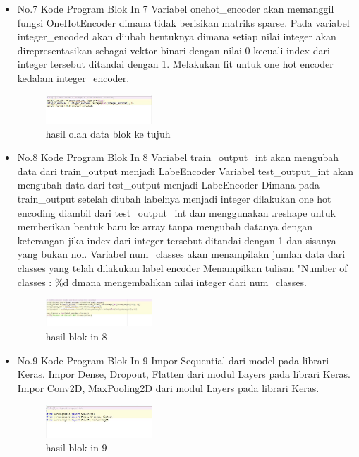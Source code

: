 \begin{enumerate}
\begin{itemize}
        \item  {No.7 Kode Program Blok In 7}
        \subitem Variabel onehot\_encoder akan memanggil fungsi OneHotEncoder dimana tidak berisikan matriks sparse.
        \subitem  Pada variabel integer\_encoded akan diubah bentuknya dimana setiap nilai integer akan direpresentasikan sebagai vektor binari dengan nilai 0 kecuali index dari integer tersebut ditandai dengan 1.
        \subitem  Melakukan fit untuk one hot encoder kedalam integer\_encoder.
        \begin{figure}[H]
            \includegraphics[width=4cm]{figures/1174039/chapter7/praktek7.jpg}
            \centering
            \caption{hasil olah data blok ke tujuh}
        \end{figure}
        
        \item  {No.8 Kode Program Blok In 8}
        \subitem  Variabel train\_output\_int  akan mengubah data dari train\_output menjadi LabeEncoder
        \subitem Variabel test\_output\_int  akan mengubah data dari test\_output menjadi LabeEncoder
        \subitem  Dimana pada train\_output setelah diubah labelnya menjadi integer dilakukan one hot encoding diambil dari test\_output\_int dan menggunakan .reshape untuk memberikan bentuk baru ke array tanpa mengubah datanya dengan keterangan jika index dari integer tersebut ditandai dengan 1 dan sisanya yang bukan nol.
        \subitem  Variabel num\_classes akan menampilakn jumlah data dari classes yang telah dilakukan label encoder
        \subitem  Menampilkan tulisan "Number of classes : \%d dmana mengembalikan nilai integer dari num\_classes.
        \begin{figure}[H]
            \includegraphics[width=4cm]{figures/1174039/chapter7/praktek8.jpg}
            \centering
            \caption{hasil blok in 8}
        \end{figure}
        
        \item {No.9 Kode Program Blok In 9}
        \subitem Impor Sequential dari model pada librari Keras.
        \subitem Impor Dense, Dropout, Flatten dari modul Layers pada librari Keras.
        \subitem Impor Conv2D, MaxPooling2D dari modul Layers pada librari Keras.
        \begin{figure}[H]
            \includegraphics[width=4cm]{figures/1174039/chapter7/praktek9.jpg}
            \centering
            \caption{hasil blok in 9}
        \end{figure}
        

\end{itemize}
\end{enumerate}
